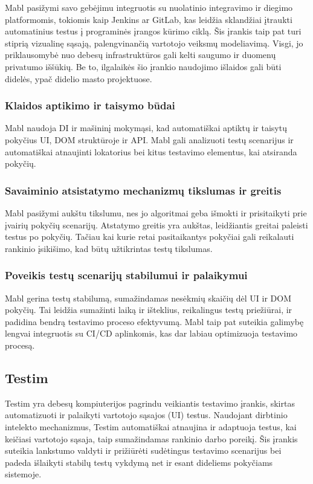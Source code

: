 \documentclass[
]{VUMIFPSkursinis}
\begin{document}
Mabl pasižymi savo gebėjimu integruotis su nuolatinio integravimo ir diegimo platformomis, tokiomis kaip Jenkins ar GitLab, kas leidžia sklandžiai įtraukti automatinius testus į programinės įrangos kūrimo ciklą. Šis įrankis taip pat turi stiprią vizualinę sąsają, palengvinančią vartotojo veiksmų modeliavimą. Visgi, jo priklausomybė nuo debesų infrastruktūros gali kelti saugumo ir duomenų privatumo iššūkių. Be to, ilgalaikės šio įrankio naudojimo išlaidos gali būti didelės, ypač didelio masto projektuose.\cite{Mabl}

\subsubsection{Klaidos aptikimo ir taisymo būdai}

Mabl naudoja DI ir mašininį mokymąsi, kad automatiškai aptiktų ir taisytų pokyčius UI, DOM struktūroje ir API. Mabl gali analizuoti testų scenarijus ir automatiškai atnaujinti lokatorius bei kitus testavimo elementus, kai atsiranda pokyčių.

\subsubsection{Savaiminio atsistatymo mechanizmų tikslumas ir greitis}

Mabl pasižymi aukštu tikslumu, nes jo algoritmai geba išmokti ir prisitaikyti prie įvairių pokyčių scenarijų. Atstatymo greitis yra aukštas, leidžiantis greitai paleisti testus po pokyčių. Tačiau kai kurie retai pasitaikantys pokyčiai gali reikalauti rankinio įsikišimo, kad būtų užtikrintas testų tikslumas.

\subsubsection{Poveikis testų scenarijų stabilumui ir palaikymui}

Mabl gerina testų stabilumą, sumažindamas nesėkmių skaičių dėl UI ir DOM pokyčių. Tai leidžia sumažinti laiką ir išteklius, reikalingus testų priežiūrai, ir padidina bendrą testavimo proceso efektyvumą. Mabl taip pat suteikia galimybę lengvai integruotis su CI/CD aplinkomis, kas dar labiau optimizuoja testavimo procesą.

\subsection{Testim}
Testim yra debesų kompiuterijos pagrindu veikiantis testavimo įrankis, skirtas automatizuoti ir palaikyti vartotojo sąsajos (UI) testus. Naudojant dirbtinio intelekto mechanizmus, Testim automatiškai atnaujina ir adaptuoja testus, kai keičiasi vartotojo sąsaja, taip sumažindamas rankinio darbo poreikį. Šis įrankis suteikia lankstumo valdyti ir prižiūrėti sudėtingus testavimo scenarijus bei padeda išlaikyti stabilų testų vykdymą net ir esant dideliems pokyčiams sistemoje.
\end{document}

